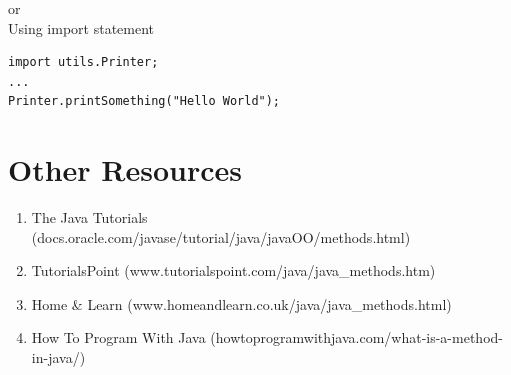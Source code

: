 \documentclass[a4paper]{article}
\begin{document}
or
\\Using import statement
\begin{lstlisting}
import utils.Printer;
...
Printer.printSomething("Hello World");
\end{lstlisting}

\newpage

\section*{Other Resources}
\begin{enumerate}
\item The Java Tutorials (docs.oracle.com/javase/tutorial/java/javaOO/methods.html) 
\item TutorialsPoint (www.tutorialspoint.com/java/java\_methods.htm) 
\item Home \& Learn (www.homeandlearn.co.uk/java/java\_methods.html) 
\item How To Program With Java (howtoprogramwithjava.com/what-is-a-method-in-java/) 
\end{enumerate}
\end{document}

